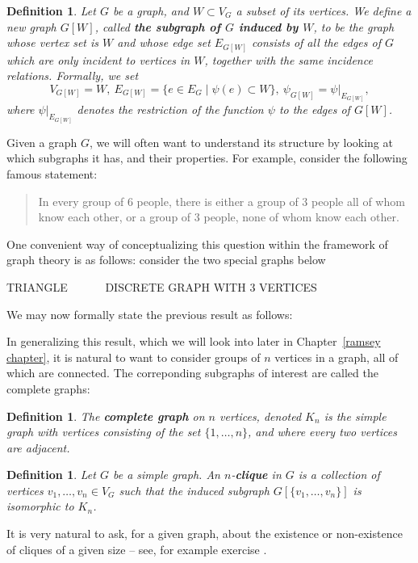 \documentclass[12pt]{report}
\theoremstyle{plain}
\newtheorem{defn}[thm]{Definition}
\newcommand{\Xb}[1]{\textbf{#1}\index{#1}}
\begin{document}
\begin{defn}
Let $G$ be a graph, and $W \subset V_G$ a subset of its vertices. We
define a new graph $G[W]$, called \textbf{the subgraph of $G$ induced by
$W$}, to be the graph whose vertex set is $W$ and
whose edge set $E_{G[W]}$ consists of all the edges of $G$ which are only
incident to vertices in $W$, together with the same incidence relations.
Formally, we set
\[ V_{G[W]} = W, \ E_{G[W]} = \{ e \in E_G \mid \psi(e) \subset W\}, \
\psi_{G[W]} = \psi|_{E_{G[W]}},\]
where $\psi|_{E_{G[W]}}$ denotes the restriction of the function $\psi$ to
the edges of $G[W]$.
\end{defn}

Given a graph $G$, we will often want to understand its structure by
looking at which subgraphs it has, and their properties. For example,
consider the following famous statement:

\begin{quote}
In every group of $6$ people, there is either a group of $3$ people all of
whom know each other, or a group of $3$ people, none of whom know each
other.
\end{quote}

One convenient way of conceptualizing this question within the framework of
graph theory is as follows: consider the two special graphs below

TRIANGLE   \ \ \ \ \ \ DISCRETE GRAPH WITH 3 VERTICES

We may now formally state the previous result as follows:

In generalizing this result, which we will look into later in
Chapter~\ref{ramsey chapter}, it is natural to want to consider groups of
$n$ vertices in a graph, all of which are connected. The correponding
subgraphs of interest are called the complete graphs:

\begin{defn}
The \Xb{complete graph} on $n$ vertices, denoted $K_n$ is the simple graph
with vertices consisting of the set $\{1, \ldots, n\}$, and where every two
vertices are adjacent.
\end{defn}

\begin{defn}
Let $G$ be a simple graph. An $n$-\Xb{clique} in $G$ is a collection of
vertices $v_1, \ldots, v_n \in V_G$ such that the induced subgraph
$G[\{v_1, \ldots, v_n\}]$ is isomorphic to $K_n$.
\end{defn}

It is very natural to ask, for a given graph, about the existence or
non-existence of cliques of a given size -- see, for example exercise
\label{ramsey 6}.
\end{document}
